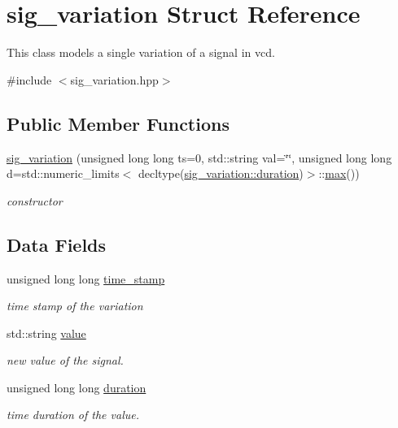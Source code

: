 \hypertarget{structsig__variation}{}\section{sig\+\_\+variation Struct Reference}
\label{structsig__variation}


This class models a single variation of a signal in vcd.  




{\ttfamily \#include $<$sig\+\_\+variation.\+hpp$>$}

\subsection*{Public Member Functions}
\begin{DoxyCompactItemize}
\item 
\hyperlink{structsig__variation_a662a07a549ae57dec775ee87b34178b2}{sig\+\_\+variation} (unsigned long long ts=0, std\+::string val=\char`\"{}\char`\"{}, unsigned long long d=std\+::numeric\+\_\+limits$<$ decltype(\hyperlink{structsig__variation_a9c3dba4fe347f37cd24dae789e79f815}{sig\+\_\+variation\+::duration})$>$\+::\hyperlink{tutorial__pact__2019_2Target-Customization_2first_2hint_8c_a28f422940797ea297699ba55d89171c5}{max}())
\begin{DoxyCompactList}\small\item\em constructor \end{DoxyCompactList}\end{DoxyCompactItemize}
\subsection*{Data Fields}
\begin{DoxyCompactItemize}
\item 
unsigned long long \hyperlink{structsig__variation_a14e4cabe45be1cadeb2b1dc9bfa0febe}{time\+\_\+stamp}
\begin{DoxyCompactList}\small\item\em time stamp of the variation \end{DoxyCompactList}\item 
std\+::string \hyperlink{structsig__variation_ada641a51a756b61614d619be6a772d09}{value}
\begin{DoxyCompactList}\small\item\em new value of the signal. \end{DoxyCompactList}\item 
unsigned long long \hyperlink{structsig__variation_a9c3dba4fe347f37cd24dae789e79f815}{duration}
\begin{DoxyCompactList}\small\item\em time duration of the value. \end{DoxyCompactList}\end{DoxyCompactItemize}



